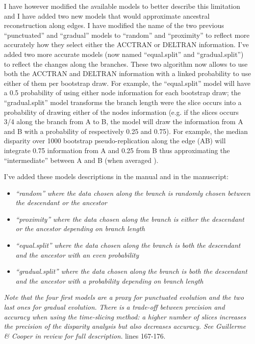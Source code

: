 \documentclass[12pt,letterpaper]{article}
\begin{document}
\begin{enumerate}
I have however modified the available models to better describe this limitation and I have added two new models that would approximate ancestral reconstruction along edges.
I have modified the name of the two previous ``punctuated'' and ``gradual'' models to ``random'' and ``proximity'' to reflect more accurately how they select either the ACCTRAN or DELTRAN information.
I've added two more accurate models (now named ``equal.split'' and ``gradual.split'') to reflect the changes along the branches.
These two algorithm now allows to use both the ACCTRAN and DELTRAN information with a linked probability to use either of them per bootstrap draw.
For example, the ``equal.split'' model will have a 0.5 probability of using either node information for each bootstrap draw; the ``gradual.split'' model transforms the branch length were the slice occurs into a probability of drawing either of the nodes information (e.g. if the slices occurs 3/4 along the branch from A to B, the model will draw the information from A and B with a probability of respectively 0.25 and 0.75).
For example, the median disparity over 1000 bootstrap pseudo-replication along the edge (AB) will integrate 0.75 information from A and 0.25 from B thus approximating the ``intermediate'' between A and B (when averaged ).

I've added these models descriptions in the manual and in the manuscript:

\begin{itemize}
    \item \textit{``random'' where the data chosen along the branch is randomly chosen between the descendant or the ancestor}
    \item \textit{``proximity'' where the data chosen along the branch is either the descendant or the ancestor depending on branch length}
    \item \textit{``equal.split'' where the data chosen along the branch is both the descendant and the ancestor with an even probability}
    \item \textit{``gradual.split'' where the data chosen along the branch is both the descendant and the ancestor with a probability depending on branch length}
\end{itemize}

\textit{Note that the four first models are a proxy for punctuated evolution and the two last ones for gradual evolution.
There is a trade-off between precision and accuracy when using the time-slicing method: a higher number of slices increases the precision of the disparity analysis but also decreases accuracy.
See Guillerme \& Cooper \textit{in review} for full description.} lines 167-176.



\end{enumerate}
\end{document}

